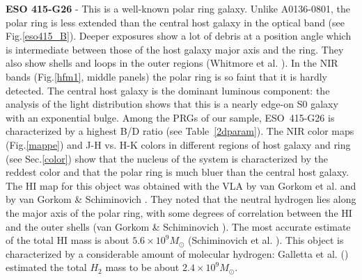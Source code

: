 \documentclass{aa}
\begin{document}
{\bf ESO 415-G26} -
This is a well-known polar ring galaxy.
Unlike A0136-0801, the polar ring is less extended than the central host 
galaxy in the optical band (see Fig.\ref{eso415_B}). 
Deeper exposures show a lot of debris at a position
angle which is intermediate between those of the host galaxy major axis
and the ring. They also show 
shells and loops in the outer regions (Whitmore et al. \cite{whitmore87}). 
In the NIR bands (Fig.\ref{hfm1}, middle panels) 
the polar ring is so faint that it is hardly detected. 
The central host galaxy is the dominant luminous component:
the analysis of the light distribution shows that 
this is a nearly edge-on S0 galaxy with an exponential bulge. 
Among the PRGs of our sample, ESO~415-G26 is characterized by a highest
B/D ratio (see Table~\ref{2dparam}).
The NIR color maps (Fig.\ref{mappe}) and J-H vs. H-K colors in
different regions of host galaxy and ring  (see Sec.\ref{color})
show that the nucleus of the system is characterized by the reddest color and 
that the polar ring is much bluer than the central host galaxy. The 
HI map for this object was obtained with the VLA by van Gorkom et al. \cite{vgorkom87} 
and by van Gorkom \& Schiminovich \cite{vgorkom97}. 
They noted that the neutral hydrogen lies along the major axis of the polar 
ring, with some degrees of correlation between the HI and the outer
shells (van Gorkom \& Schiminovich \cite{vgorkom97}).
The most accurate estimate of the total HI mass is about 
$5.6 \times 10^9 M_{\odot}$ (Schiminovich et al. \cite{Schiminovich97}).
This object is characterized by a considerable amount of molecular hydrogen:
Galletta et al. (\cite{galletta97}) estimated the total $H_{2}$ mass to
be about $2.4 \times 10^9 M_{\odot}$.

\bigskip
\end{document}
